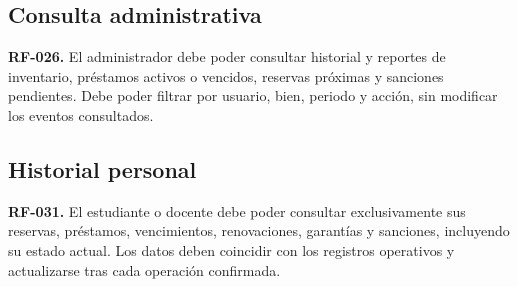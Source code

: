 \subsection{Consulta administrativa}
\textbf{RF-026.} El administrador debe poder consultar historial y reportes de inventario, pr\'estamos activos o vencidos, reservas pr\'oximas y sanciones pendientes. Debe poder filtrar por usuario, bien, periodo y acci\'on, sin modificar los eventos consultados.

\subsection{Historial personal}
\textbf{RF-031.} El estudiante o docente debe poder consultar exclusivamente sus reservas, pr\'estamos, vencimientos, renovaciones, garant\'ias y sanciones, incluyendo su estado actual. Los datos deben coincidir con los registros operativos y actualizarse tras cada operaci\'on confirmada.
